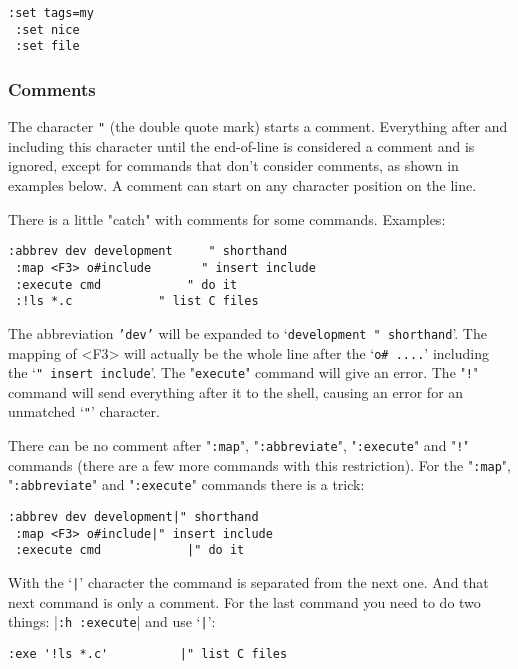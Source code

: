 \begin{Verbatim}[samepage=true]
 :set tags=my
 :set nice
 :set file
\end{Verbatim}

\subsubsection{Comments}
The character \texttt{"} (the double quote mark) starts a comment.
Everything after and including this character until the end-of-line is considered a comment and is ignored, except for commands that don't consider comments, as shown in examples below.
A comment can start on any character position on the line.

There is a little "catch" with comments for some commands.
Examples:

\begin{Verbatim}[samepage=true]
 :abbrev dev development     " shorthand
 :map <F3> o#include       " insert include
 :execute cmd            " do it
 :!ls *.c            " list C files
\end{Verbatim}

The abbreviation \texttt{'dev'} will be expanded to `\texttt{development     " shorthand}'.
The mapping of <F3> will actually be the whole line after the `\texttt{o\# ....}' including the `\texttt{" insert include}'.
The "\texttt{execute}" command will give an error.
The "\texttt{!}" command will send everything after it to the shell, causing an error for an unmatched `\texttt{"}' character.

There can be no comment after "\texttt{:map}", "\texttt{:abbreviate}", "\texttt{:execute}" and "\texttt{!}" commands (there are a few more commands with this restriction).
For the "\texttt{:map}", "\texttt{:abbreviate}" and "\texttt{:execute}" commands there is a trick:

\begin{Verbatim}[samepage=true]
 :abbrev dev development|" shorthand
 :map <F3> o#include|" insert include
 :execute cmd            |" do it
\end{Verbatim}

With the `\texttt{|}' character the command is separated from the next one.
And that next command is only a comment.
For the last command you need to do two things: |\texttt{:h :execute}| and use `\texttt{|}':

\begin{Verbatim}[samepage=true]
 :exe '!ls *.c'          |" list C files
\end{Verbatim}

